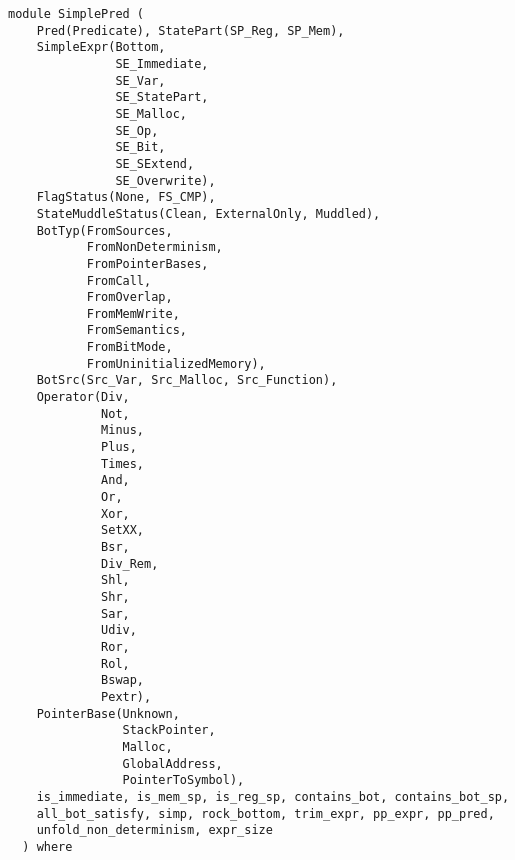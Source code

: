 \label{module:SimplePred}
\haddockbeginheader
{\haddockverb\begin{verbatim}
module SimplePred (
    Pred(Predicate), StatePart(SP_Reg, SP_Mem),
    SimpleExpr(Bottom,
               SE_Immediate,
               SE_Var,
               SE_StatePart,
               SE_Malloc,
               SE_Op,
               SE_Bit,
               SE_SExtend,
               SE_Overwrite),
    FlagStatus(None, FS_CMP),
    StateMuddleStatus(Clean, ExternalOnly, Muddled),
    BotTyp(FromSources,
           FromNonDeterminism,
           FromPointerBases,
           FromCall,
           FromOverlap,
           FromMemWrite,
           FromSemantics,
           FromBitMode,
           FromUninitializedMemory),
    BotSrc(Src_Var, Src_Malloc, Src_Function),
    Operator(Div,
             Not,
             Minus,
             Plus,
             Times,
             And,
             Or,
             Xor,
             SetXX,
             Bsr,
             Div_Rem,
             Shl,
             Shr,
             Sar,
             Udiv,
             Ror,
             Rol,
             Bswap,
             Pextr),
    PointerBase(Unknown,
                StackPointer,
                Malloc,
                GlobalAddress,
                PointerToSymbol),
    is_immediate, is_mem_sp, is_reg_sp, contains_bot, contains_bot_sp,
    all_bot_satisfy, simp, rock_bottom, trim_expr, pp_expr, pp_pred,
    unfold_non_determinism, expr_size
  ) where\end{verbatim}}
\haddockendheader

